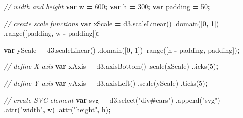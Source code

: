 \documentclass[openany]{book}
\newenvironment{Shaded}{\begin{snugshade}}{\end{snugshade}}
\newcommand{\AttributeTok}[1]{\textcolor[rgb]{0.77,0.63,0.00}{#1}}
\newcommand{\CommentTok}[1]{\textcolor[rgb]{0.56,0.35,0.01}{\textit{#1}}}
\newcommand{\DecValTok}[1]{\textcolor[rgb]{0.00,0.00,0.81}{#1}}
\newcommand{\KeywordTok}[1]{\textcolor[rgb]{0.13,0.29,0.53}{\textbf{#1}}}
\newcommand{\NormalTok}[1]{#1}
\newcommand{\OperatorTok}[1]{\textcolor[rgb]{0.81,0.36,0.00}{\textbf{#1}}}
\newcommand{\StringTok}[1]{\textcolor[rgb]{0.31,0.60,0.02}{#1}}
\newcommand{\VariableTok}[1]{\textcolor[rgb]{0.00,0.00,0.00}{#1}}
\begin{document}
\begin{Shaded}
\begin{Highlighting}[]
\CommentTok{// width and height}
\KeywordTok{var}\NormalTok{ w }\OperatorTok{=} \DecValTok{600}\OperatorTok{;}
\KeywordTok{var}\NormalTok{ h }\OperatorTok{=} \DecValTok{300}\OperatorTok{;}
\KeywordTok{var}\NormalTok{ padding }\OperatorTok{=} \DecValTok{50}\OperatorTok{;}

\CommentTok{// create scale functions}
\KeywordTok{var}\NormalTok{ xScale }\OperatorTok{=} \VariableTok{d3}\NormalTok{.}\AttributeTok{scaleLinear}\NormalTok{()}
\NormalTok{                     .}\AttributeTok{domain}\NormalTok{([}\DecValTok{0}\OperatorTok{,} \DecValTok{1}\NormalTok{])}
\NormalTok{                     .}\AttributeTok{range}\NormalTok{([padding}\OperatorTok{,}\NormalTok{ w }\OperatorTok{-}\NormalTok{ padding])}\OperatorTok{;}

\KeywordTok{var}\NormalTok{ yScale }\OperatorTok{=} \VariableTok{d3}\NormalTok{.}\AttributeTok{scaleLinear}\NormalTok{()}
\NormalTok{                     .}\AttributeTok{domain}\NormalTok{([}\DecValTok{0}\OperatorTok{,} \DecValTok{1}\NormalTok{])}
\NormalTok{                     .}\AttributeTok{range}\NormalTok{([h }\OperatorTok{-}\NormalTok{ padding}\OperatorTok{,}\NormalTok{ padding])}\OperatorTok{;}

\CommentTok{// define X axis}
\KeywordTok{var}\NormalTok{ xAxis }\OperatorTok{=} \VariableTok{d3}\NormalTok{.}\AttributeTok{axisBottom}\NormalTok{()}
\NormalTok{                  .}\AttributeTok{scale}\NormalTok{(xScale)}
\NormalTok{                  .}\AttributeTok{ticks}\NormalTok{(}\DecValTok{5}\NormalTok{)}\OperatorTok{;}

\CommentTok{// define Y axis}
\KeywordTok{var}\NormalTok{ yAxis }\OperatorTok{=} \VariableTok{d3}\NormalTok{.}\AttributeTok{axisLeft}\NormalTok{()}
\NormalTok{                  .}\AttributeTok{scale}\NormalTok{(yScale)}
\NormalTok{                  .}\AttributeTok{ticks}\NormalTok{(}\DecValTok{5}\NormalTok{)}\OperatorTok{;}

\CommentTok{// create SVG element}
\KeywordTok{var}\NormalTok{ svg }\OperatorTok{=} \VariableTok{d3}\NormalTok{.}\AttributeTok{select}\NormalTok{(}\StringTok{"div#cars"}\NormalTok{)}
\NormalTok{            .}\AttributeTok{append}\NormalTok{(}\StringTok{"svg"}\NormalTok{)}
\NormalTok{            .}\AttributeTok{attr}\NormalTok{(}\StringTok{"width"}\OperatorTok{,}\NormalTok{ w)}
\NormalTok{            .}\AttributeTok{attr}\NormalTok{(}\StringTok{"height"}\OperatorTok{,}\NormalTok{ h)}\OperatorTok{;}


\end{Highlighting}
\end{Shaded}
\end{document}
